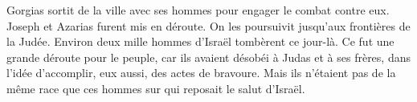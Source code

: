 Gorgias sortit de la ville avec ses hommes pour engager le combat contre eux.
Joseph et Azarias furent mis en déroute.
	On les poursuivit jusqu’aux frontières de la Judée.
	Environ deux mille hommes d’Israël tombèrent ce jour-là.
Ce fut une grande déroute pour le peuple,
	car ils avaient désobéi à Judas et à ses frères,
	dans l’idée d’accomplir, eux aussi, des actes de bravoure.
Mais ils n’étaient pas de la même race que ces hommes sur qui reposait le salut d’Israël.
